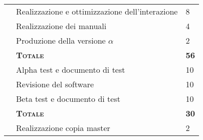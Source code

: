 \begin{tabularx}{\textwidth}{|m{5cm}|X|M{2cm}|}
	                                                                          & Realizzazione e ottimizzazione dell'interazione                & 8                                                        \\  
	                                                                          & Realizzazione dei manuali                                      & 4                                                        \\  
	                                                                          & Produzione della versione $\alpha$                             & 2                                                        \\  
	                                       & \textbf{\textsc{Totale}}                                     & \textbf{56}                                               \\ \hline
	                                                                          & Alpha test e documento di test                                 & 10                                                        \\  
	                                                                          & Revisione del software                                         & 10                                                        \\  
	                                                                          & Beta test e documento di test                                  & 10                                                        \\  
	                                           & \textbf{\textsc{Totale}}                                     & \textbf{30}                                               \\ \hline
	                                                                          & Realizzazione copia master                                     & 2                                                        \\  

\end{tabularx}
